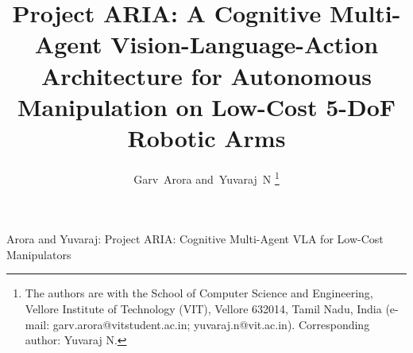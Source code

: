 \documentclass[journal]{IEEEtran}
\begin{document}
\title{Project ARIA: A Cognitive Multi-Agent Vision-Language-Action Architecture for Autonomous Manipulation on Low-Cost 5-DoF Robotic Arms}

\author{Garv~Arora
        and~Yuvaraj~N%
\thanks{The authors are with the School of Computer Science and Engineering, Vellore Institute of Technology (VIT), Vellore 632014, Tamil Nadu, India (e-mail: garv.arora@vitstudent.ac.in; yuvaraj.n@vit.ac.in). Corresponding author: Yuvaraj N.}}

%
{Arora and Yuvaraj: Project ARIA: Cognitive Multi-Agent VLA for Low-Cost Manipulators}

\maketitle
\end{document}
